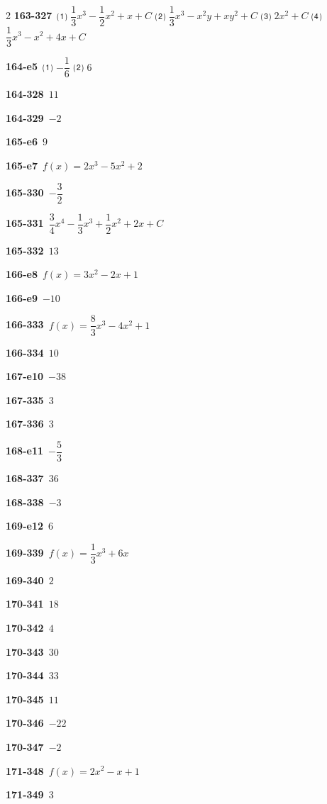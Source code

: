 \documentclass[10pt,a4paper]{article}
\begin{document}
\begin{multicols}{2}
\noindent\textbf{163-327}\ ⑴ $\dfrac{1}{3}x^3-\dfrac{1}{2}x^2+x+C$ ⑵ $\dfrac{1}{3}x^3-x^2y+xy^2+C$ ⑶ $2x^2+C$ ⑷ $\dfrac{1}{3}x^3-x^2+4x+C$\par
\noindent\textbf{164-e5}\ ⑴ $-\dfrac{1}{6}$ ⑵ $6$\par
\noindent\textbf{164-328}\ $11$\par
\noindent\textbf{164-329}\ $-2$\par
\noindent\textbf{165-e6}\ $9$\par
\noindent\textbf{165-e7}\ $f(x)=2x^3-5x^2+2$\par
\noindent\textbf{165-330}\ $-\dfrac{3}{2}$\par
\noindent\textbf{165-331}\ $\dfrac{3}{4}x^4-\dfrac{1}{3}x^3+\dfrac{1}{2}x^2+2x+C$\par
\noindent\textbf{165-332}\ $13$\par
\noindent\textbf{166-e8}\ $f(x)=3x^2-2x+1$\par
\noindent\textbf{166-e9}\ $-10$\par
\noindent\textbf{166-333}\ $f(x)=\dfrac{8}{3}x^3-4x^2+1$\par
\noindent\textbf{166-334}\ $10$\par
\noindent\textbf{167-e10}\ $-38$\par
\noindent\textbf{167-335}\ $3$\par
\noindent\textbf{167-336}\ $3$\par
\noindent\textbf{168-e11}\ $-\dfrac{5}{3}$\par
\noindent\textbf{168-337}\ $36$\par
\noindent\textbf{168-338}\ $-3$\par
\noindent\textbf{169-e12}\ $6$\par
\noindent\textbf{169-339}\ $f(x)=\dfrac{1}{3}x^3+6x$\par
\noindent\textbf{169-340}\ $2$\par
\noindent\textbf{170-341}\ $18$\par
\noindent\textbf{170-342}\ $4$\par
\noindent\textbf{170-343}\ $30$\par
\noindent\textbf{170-344}\ $33$\par
\noindent\textbf{170-345}\ $11$\par
\noindent\textbf{170-346}\ $-22$\par
\noindent\textbf{170-347}\ $-2$\par
\noindent\textbf{171-348}\ $f(x)=2x^2-x+1$\par
\noindent\textbf{171-349}\ $3$\par

\end{multicols}
\end{document}
